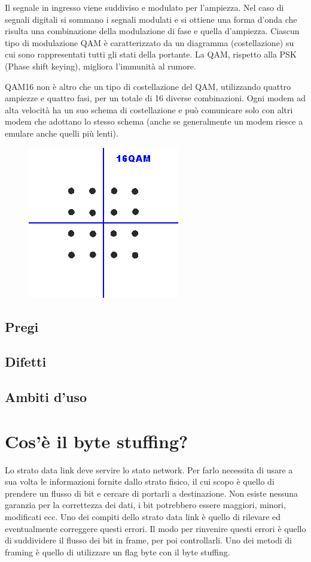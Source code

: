Il segnale in ingresso viene suddiviso e modulato per l'ampiezza. Nel caso di segnali digitali si sommano i segnali modulati e si ottiene una forma d'onda che risulta una combinazione della modulazione di fase e quella d'ampiezza.
Ciascun tipo di modulazione QAM è caratterizzato da un diagramma (costellazione) su cui sono rappresentati tutti gli stati della portante.
La QAM, rispetto alla PSK (Phase shift keying), migliora l'immunità al rumore.

QAM16 non è altro che un tipo di costellazione del QAM, utilizzando quattro ampiezze e quattro fasi, per un totale di 16 diverse combinazioni. Ogni modem ad alta velocità ha un suo schema di costellazione e può comunicare solo con altri modem che adottano lo stesso schema (anche se generalmente un modem riesce a emulare anche quelli più lenti).

\begin{figure}[H]
\centering
\includegraphics[scale=0.6]{res/img/12_QAM16.png}
\end{figure}

\subsection{Pregi}
\subsection{Difetti}
\subsection{Ambiti d'uso}

\section{Cos'è il byte stuffing?}

Lo strato data link deve servire lo stato network. Per farlo necessita di usare a sua volta le informazioni fornite dallo strato fisico, il cui scopo è quello di prendere un flusso di bit e cercare di portarli a destinazione.
Non esiste nessuna garanzia per la correttezza dei dati, i bit potrebbero essere maggiori, minori, modificati ecc. Uno dei compiti dello strato data link è quello di rilevare ed eventualmente correggere questi errori.
Il modo per rinvenire questi errori è quello di suddividere il flusso dei bit in frame, per poi controllarli. Uno dei metodi di framing è quello di utilizzare un flag byte con il byte stuffing.

